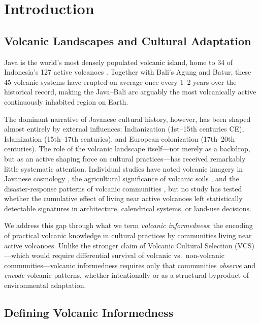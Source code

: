 \documentclass[12pt,a4paper]{article}
\begin{document}
\section{Introduction}

\subsection{Volcanic Landscapes and Cultural Adaptation}

Java is the world's most densely populated volcanic island, home to 34 of Indonesia's 127 active volcanoes \citep{gvp2023}. Together with Bali's Agung and Batur, these 45 volcanic systems have erupted on average once every 1--2 years over the historical record, making the Java--Bali arc arguably the most volcanically active continuously inhabited region on Earth.

The dominant narrative of Javanese cultural history, however, has been shaped almost entirely by external influences: Indianization (1st--15th centuries CE), Islamization (15th--17th centuries), and European colonization (17th--20th centuries). The role of the volcanic landscape itself---not merely as a backdrop, but as an active shaping force on cultural practices---has received remarkably little systematic attention. Individual studies have noted volcanic imagery in Javanese cosmology \citep{headley2004}, the agricultural significance of volcanic soils \citep{mohr1938}, and the disaster-response patterns of volcanic communities \citep{schlehe1996}, but no study has tested whether the cumulative effect of living near active volcanoes left statistically detectable signatures in architecture, calendrical systems, or land-use decisions.

We address this gap through what we term \emph{volcanic informedness}: the encoding of practical volcanic knowledge in cultural practices by communities living near active volcanoes. Unlike the stronger claim of Volcanic Cultural Selection (VCS)---which would require differential survival of volcanic vs.\ non-volcanic communities---volcanic informedness requires only that communities \emph{observe} and \emph{encode} volcanic patterns, whether intentionally or as a structural byproduct of environmental adaptation.

\subsection{Defining Volcanic Informedness}
\end{document}
